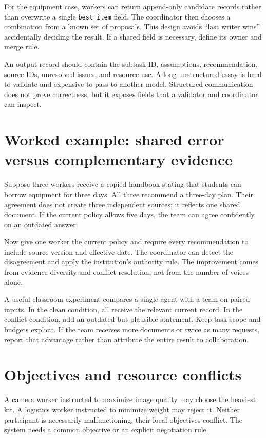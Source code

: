 For the equipment case, workers can return append-only candidate records rather than overwrite a single \texttt{best\_item} field. The coordinator then chooses a combination from a known set of proposals. This design avoids “last writer wins” accidentally deciding the result. If a shared field is necessary, define its owner and merge rule.

An output record should contain the subtask ID, assumptions, recommendation, source IDs, unresolved issues, and resource use. A long unstructured essay is hard to validate and expensive to pass to another model. Structured communication does not prove correctness, but it exposes fields that a validator and coordinator can inspect.

\section{Worked example: shared error versus complementary evidence}
Suppose three workers receive a copied handbook stating that students can borrow equipment for three days. All three recommend a three-day plan. Their agreement does not create three independent sources; it reflects one shared document. If the current policy allows five days, the team can agree confidently on an outdated answer.

Now give one worker the current policy and require every recommendation to include source version and effective date. The coordinator can detect the disagreement and apply the institution's authority rule. The improvement comes from evidence diversity and conflict resolution, not from the number of voices alone.

A useful classroom experiment compares a single agent with a team on paired inputs. In the clean condition, all receive the relevant current record. In the conflict condition, add an outdated but plausible statement. Keep task scope and budgets explicit. If the team receives more documents or twice as many requests, report that advantage rather than attribute the entire result to collaboration.

\section{Objectives and resource conflicts}
A camera worker instructed to maximize image quality may choose the heaviest kit. A logistics worker instructed to minimize weight may reject it. Neither participant is necessarily malfunctioning; their local objectives conflict. The system needs a common objective or an explicit negotiation rule.

